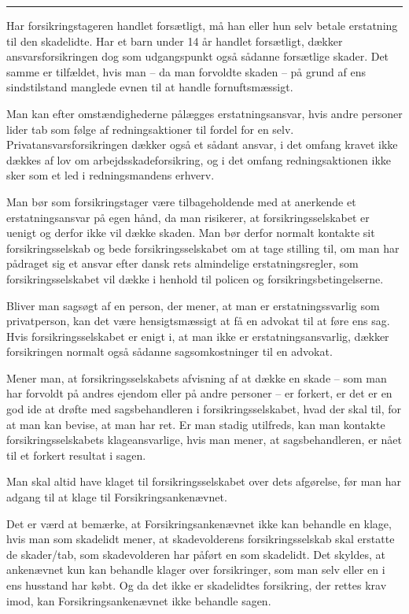 \documentclass[]{book}
\begin{document}
\begin{center}\rule{0.5\linewidth}{\linethickness}\end{center}

Har forsikringstageren handlet forsætligt, må han eller hun selv betale erstatning til den skadelidte. Har et barn under 14 år handlet forsætligt, dækker ansvarsforsikringen dog som udgangspunkt også sådanne forsætlige skader. Det samme er tilfældet, hvis man -- da man forvoldte skaden -- på grund af ens sindstilstand manglede evnen til at handle fornuftsmæssigt.

Man kan efter omstændighederne pålægges erstatningsansvar, hvis andre personer lider tab som følge af redningsaktioner til fordel for en selv. Privatansvarsforsikringen dækker også et sådant ansvar, i det omfang kravet ikke dækkes af lov om arbejdsskadeforsikring, og i det omfang redningsaktionen ikke sker som et led i redningsmandens erhverv.

Man bør som forsikringstager være tilbageholdende med at anerkende et erstatningsansvar på egen hånd, da man risikerer, at forsikringsselskabet er uenigt og derfor ikke vil dække skaden. Man bør derfor normalt kontakte sit forsikringsselskab og bede forsikringsselskabet om at tage stilling til, om man har pådraget sig et ansvar efter dansk rets almindelige erstatningsregler, som forsikringsselskabet vil dække i henhold til policen og forsikringsbetingelserne.

Bliver man sagsøgt af en person, der mener, at man er erstatningssvarlig som privatperson, kan det være hensigtsmæssigt at få en advokat til at føre ens sag. Hvis forsikringsselskabet er enigt i, at man ikke er erstatningsansvarlig, dækker forsikringen normalt også sådanne sagsomkostninger til en advokat.

Mener man, at forsikringsselskabets afvisning af at dække en skade -- som man har forvoldt på andres ejendom eller på andre personer -- er forkert, er det er en god ide at drøfte med sagsbehandleren i forsikringsselskabet, hvad der skal til, for at man kan bevise, at man har ret. Er man stadig utilfreds, kan man kontakte forsikringsselskabets klageansvarlige, hvis man mener, at sagsbehandleren, er nået til et forkert resultat i sagen.

Man skal altid have klaget til forsikringsselskabet over dets afgørelse, før man har adgang til at klage til Forsikringsankenævnet.

Det er værd at bemærke, at Forsikringsankenævnet ikke kan behandle en klage, hvis man som skadelidt mener, at skadevolderens forsikringsselskab skal erstatte de skader/tab, som skadevolderen har påført en som skadelidt. Det skyldes, at ankenævnet kun kan behandle klager over forsikringer, som man selv eller en i ens husstand har købt. Og da det ikke er skadelidtes forsikring, der rettes krav imod, kan Forsikringsankenævnet ikke behandle sagen.
\end{document}
